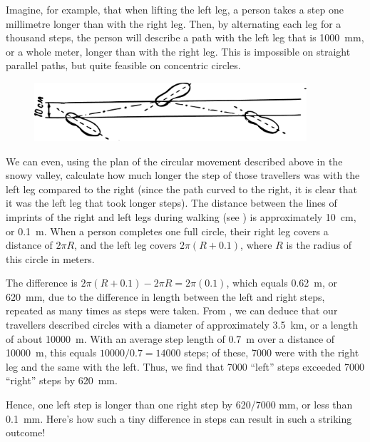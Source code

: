 Imagine, for example, that when lifting the left leg, a person takes a step one millimetre longer than with the right leg. Then, by alternating each leg for a thousand steps, the person will describe a path with the left leg that is \SI{1000}{\milli\meter}, or a whole meter, longer than with the right leg. This is impossible on straight parallel paths, but quite feasible on concentric circles.
\begin{figure}[h!]
\centering
\includegraphics[width=0.9\textwidth]{figures/ch-08/fig-115.pdf}
\end{figure}


We can even, using the plan of the circular movement described above in the snowy valley, calculate how much longer the step of those travellers was with the left leg compared to the right (since the path curved to the right, it is clear that it was the left leg that took longer steps). The distance between the lines of imprints of the right and left legs during walking (see ) is approximately \SI{10}{\centi\meter}, or \SI{0.1}{\meter}. When a person completes one full circle, their right leg covers a distance of $2\pi R$, and the left leg covers $2\pi(R + 0.1)$, where $R$ is the radius of this circle in meters. 



The difference is $2\pi(R + 0.1) - 2 \pi R  = 2 \pi(0.1)$, which equals \SI{0.62}{\meter}, or \SI{620}{\milli\meter}, due to the difference in length between the left and right steps, repeated as many times as steps were taken. From , we can deduce that our travellers described circles with a diameter of approximately \SI{3.5}{\kilo\meter}, or a length of about \SI{10000}{\meter}. With an average step length of \SI{0.7}{\meter} over a distance of \SI{10000}{\meter}, this equals $10000/0.7 = 14000$ steps; of these, 7000 were with the right leg and the same with the left. Thus, we find that 7000 ``left'' steps exceeded 7000 ``right'' steps by \SI{620}{\milli\meter}.

Hence, one left step is longer than one right step by 620/7000 mm, or less than \SI{0.1}{\milli\meter}. Here's how such a tiny difference in steps can result in such a striking outcome!

